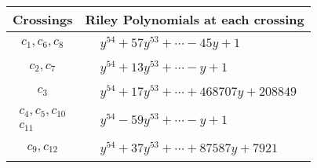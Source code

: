 \documentclass[1p]{elsarticle_modified}
\theoremstyle{definition}
\begin{document}
\begin{tabular}{m{50pt}|m{274pt}}
Crossings & \hspace{64pt}Riley Polynomials at each crossing \\
\hline $$\begin{aligned}c_{1},c_{6},c_{8}\end{aligned}$$&$\begin{aligned}
&y^{54}+57 y^{53}+\cdots-45 y+1
\end{aligned}$\\
\hline $$\begin{aligned}c_{2},c_{7}\end{aligned}$$&$\begin{aligned}
&y^{54}+13 y^{53}+\cdots- y+1
\end{aligned}$\\
\hline $$\begin{aligned}c_{3}\end{aligned}$$&$\begin{aligned}
&y^{54}+17 y^{53}+\cdots+468707 y+208849
\end{aligned}$\\
\hline $$\begin{aligned}c_{4},c_{5},c_{10}\\c_{11}\end{aligned}$$&$\begin{aligned}
&y^{54}-59 y^{53}+\cdots- y+1
\end{aligned}$\\
\hline $$\begin{aligned}c_{9},c_{12}\end{aligned}$$&$\begin{aligned}
&y^{54}+37 y^{53}+\cdots+87587 y+7921
\end{aligned}$\\
\hline
\end{tabular}
\vskip 2pc
\end{document}
